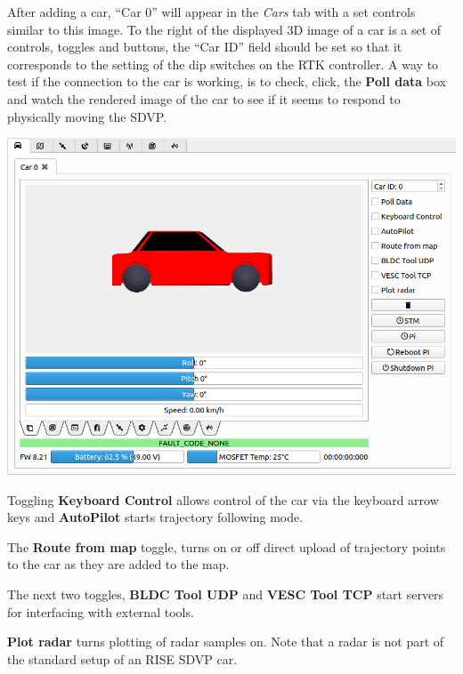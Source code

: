 \documentclass[12pt]{article} %
\begin{document}

  After adding a car, ``Car 0'' will appear in the {\em Cars} tab with
  a set controls similar to this image.  To the right of the displayed
  3D image of a car is a set of controls, toggles and buttons, the
  ``Car ID'' field should be set so that it corresponds to the setting
  of the dip switches on the RTK controller. A way to test if the
  connection to the car is working, is to check, click, the {\bf Poll data}
  box and watch the rendered image of the car to see if it seems to respond
  to physically moving the SDVP.


  
\noindent \begin{minipage}{0.5\textwidth}
    \noindent \includegraphics[width=\textwidth]{./screens/Car_orientation.png}
\end{minipage}
\begin{minipage}{0.5\textwidth} %

   Toggling {\bf Keyboard Control}
  allows control of the car via the keyboard arrow keys and {\bf
    AutoPilot} starts trajectory following mode.

  The {\bf Route from map} toggle, turns on or off direct upload of
  trajectory points to the car as they are added to the map.

  The next two toggles, {\bf BLDC Tool UDP} and {\bf VESC Tool TCP}
  start servers for interfacing with external tools. 

  {\bf Plot radar} turns plotting of radar samples on. Note that a
  radar is not part of the standard setup of an RISE SDVP car.
\end{minipage}
\end{document}
